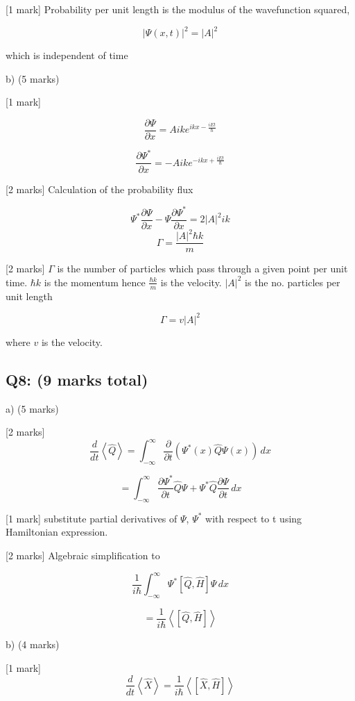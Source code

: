 \documentclass[a4paper,11pt]{article}
\begin{document}
[1 mark] Probability per unit length is the modulus of the wavefunction squared,

\[ |\Psi(x,t)|^2 = |A|^2 \]

which is independent of time

b) (5 marks)

[1 mark] 

\[ \frac{\partial \Psi}{\partial x} = Aik e^{ikx - \frac{iEt}{\hbar}} \] 

\[ \frac{\partial \Psi^{*}}{\partial x} = -Aik e^{-ikx + \frac{iEt}{\hbar}} \] 

[2 marks] Calculation of the probability flux

\[\Psi^{*}\frac{\partial \Psi}{\partial x} - \Psi\frac{\partial \Psi^{*}}{\partial x} = 2|A|^{2}ik\]
\[\Gamma = \frac{\left|A \right|^{2}\hbar k}{m} \]  

[2 marks] \( \Gamma \) is the number of particles which pass through a given point per unit time. \( \hbar k \) is the momentum hence \( \frac{\hbar k }{m} \) is the velocity.  \( |A|^2 \) is the no. particles per unit length

 \[\Gamma = v \left|A \right|^{2} \]  

where \(v\) is the velocity. 

\subsection*{Q8: (9 marks total) }

a) (5 marks)

[2 marks] \[ \frac{d}{dt} \left< \hat{Q} \right> = \int_{-\infty}^{\infty} \frac{\partial}{\partial t} \left( \Psi^{*}(x) \hat{Q} \Psi(x) \right) \, dx \]

\[ = \int_{-\infty}^{\infty} \frac{\partial \Psi^{*}}{\partial t}\hat{Q}\Psi + \Psi^{*}\hat{Q}\frac{\partial \Psi}{\partial t} \, dx \]

[1 mark] substitute partial derivatives of \(\Psi\), \(\Psi^{*}\) with respect to t using Hamiltonian expression.

[2 marks] Algebraic simplification to 

\[ \frac{1}{i\hbar} \int_{-\infty}^{\infty} \Psi^{*} \left [ \hat{Q}, \hat{H} \right ] \Psi \, dx \]

\[ = \frac{1}{i\hbar} \left<  \left [ \hat{Q}, \hat{H} \right ] \right> \]

b) (4 marks)

[1 mark]\[ \frac{d}{dt}  \left<\hat{X}\right> = \frac{1}{i\hbar}\left< \left[ \hat{X}, \hat{H} \right] \right> \] 
\end{document}
